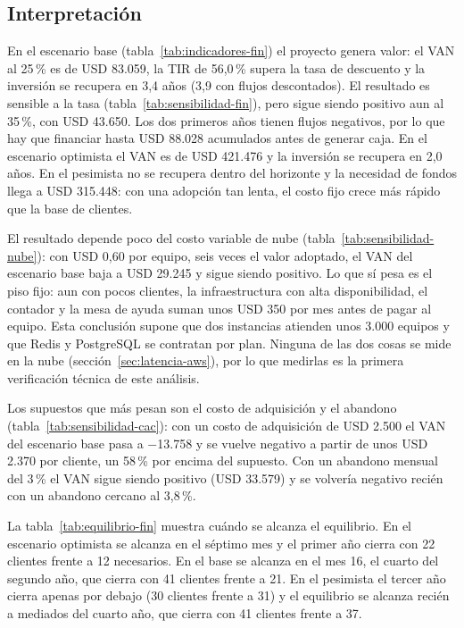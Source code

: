 \subsection{Interpretación}\label{sec:interpretacion-fin}
En el escenario base (tabla~\ref{tab:indicadores-fin}) el proyecto genera valor: el VAN al 25\,\% es
de USD 83.059, la TIR de 56,0\,\% supera la tasa de descuento y la inversión se recupera en 3,4 años
(3,9 con flujos descontados). El resultado es sensible a la tasa (tabla~\ref{tab:sensibilidad-fin}),
pero sigue siendo positivo aun al 35\,\%, con USD 43.650. Los dos primeros años tienen flujos
negativos, por lo que hay que financiar hasta USD 88.028 acumulados antes de generar caja. En el
escenario optimista el VAN es de USD 421.476 y la inversión se recupera en 2,0 años. En el pesimista
no se recupera dentro del horizonte y la necesidad de fondos llega a USD 315.448: con una adopción tan
lenta, el costo fijo crece más rápido que la base de clientes.

El resultado depende poco del costo variable de nube (tabla~\ref{tab:sensibilidad-nube}): con USD 0,60
por equipo, seis veces el valor adoptado, el VAN del escenario base baja a USD 29.245 y sigue siendo
positivo. Lo que sí pesa es el piso fijo: aun con pocos clientes, la infraestructura con alta
disponibilidad, el contador y la mesa de ayuda suman unos USD 350 por mes antes de pagar al equipo.
Esta conclusión supone que dos instancias atienden unos 3.000 equipos y que Redis y PostgreSQL se
contratan por plan. Ninguna de las dos cosas se mide en la nube (sección~\ref{sec:latencia-aws}), por lo que
medirlas es la primera verificación técnica de este análisis.

Los supuestos que más pesan son el costo de adquisición y el abandono (tabla~\ref{tab:sensibilidad-cac}): con un costo de adquisición de USD 2.500 el VAN del escenario base pasa a $-$13.758 y se vuelve negativo a partir de unos USD 2.370 por cliente, un 58\,\% por encima del supuesto. Con un abandono mensual del 3\,\% el VAN sigue siendo positivo (USD 33.579) y se volvería negativo recién con un abandono cercano al 3,8\,\%.

La tabla~\ref{tab:equilibrio-fin} muestra cuándo se alcanza el equilibrio. En el escenario optimista
se alcanza en el séptimo mes y el primer año cierra con 22 clientes frente a 12 necesarios. En el base
se alcanza en el mes 16, el cuarto del segundo año, que cierra con 41 clientes frente a 21. En el
pesimista el tercer año cierra apenas por debajo (30 clientes frente a 31) y el equilibrio se alcanza
recién a mediados del cuarto año, que cierra con 41 clientes frente a 37.

